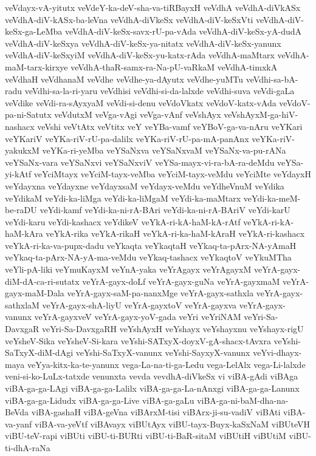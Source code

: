 {veVdayx-vA-yitutx
veVdeY-ka-deV-sha-va-tiRBayxH
veVdhA
veVdhA-diVkASx
veVdhA-diV-kASx-ba-leVna
veVdhA-diVkeSx
veVdhA-diV-keSxVti
veVdhA-diV-keSx-ga-LeMba
veVdhA-diV-keSx-savx-rU-pa-vAda
veVdhA-diV-keSx-yA-dudA
veVdhA-diV-keSxya
veVdhA-diV-keSx-ya-nitatx
veVdhA-diV-keSx-yanunx
veVdhA-diV-keSxyiM
veVdhA-diV-keSx-yu-katx-rAda
veVdhA-maMtarx
veVdhA-maM-tarx-kirxye
veVdhA-thaR-samx-ra-Na-pU-vaRkaM
veVdhA-timxkA
veVdhaH
veVdhanaM
veVdhe
veVdhe-ya-dAyutx
veVdhe-yuMTu
veVdhi-sa-bA-radu
veVdhi-sa-la-ri-yaru
veVdhisi
veVdhi-si-da-lalxde
veVdhi-suva
veVdi-gaLa
veVdike
veVdi-ra-sAyxyaM
veVdi-si-denu
veVdoVkatx
veVdoV-katx-vAda
veVdoV-pa-ni-Satutx
veVdutxM
veVga-vAgi
veVga-vAnf
veVshAyx
veVshAyxM-ga-hiV-nashacx
veVshi
veVtAtx
veVtitx
veY
veYBa-vamf
veYBoV-ga-va-nAru
veYKari
veYKariV
veYKa-riV-rU-pa-dalilx
veYKa-riV-rU-pa-mA-panAnx
veYKa-riV-yakukxM
veYKa-ri-yeMba
veYSaNxva
veYSaNxvaM
veYSaNx-va-pu-rANa
veYSaNx-vara
veYSaNxvi
veYSaNxviV
veYSa-mayx-vi-ra-bA-ra-deMdu
veYSa-yi-kAtf
veYciMtayx
veYciM-tayx-veMba
veYciM-tayx-veMdu
veYciMte
veYdayxH
veYdayxna
veYdayxne
veYdayxsaM
veYdayx-veMdu
veYdheVnuM
veYdika
veYdikaM
veYdi-ka-liMga
veYdi-ka-liMgaM
veYdi-ka-maMtarx
veYdi-ka-meM-be-raDU
veYdi-kamf
veYdi-ka-ni-rA-BAri
veYdi-ka-ni-rA-BAriV
veYdi-karU
veYdi-karu
veYdi-kashacx
veYdikeV
veYkA-ri-kA-haM-kA-rAtf
veYkA-ri-kA-haM-kAra
veYkA-rika
veYkA-rikaH
veYkA-ri-ka-haM-kAraH
veYkA-ri-kashacx
veYkA-ri-ka-va-pupx-dadu
veYkaqta
veYkaqtaH
veYkaq-ta-pArx-NA-yAmaH
veYkaq-ta-pArx-NA-yA-ma-veMdu
veYkaq-tashacx
veYkaqtoV
veYkuMTha
veYli-pA-liki
veYmuKayxM
veYnA-yaka
veYrAgayx
veYrAgayxM
veYrA-gayx-diM-dA-ca-ri-sutatx
veYrA-gayx-doLf
veYrA-gayx-guNa
veYrA-gayxmaM
veYrA-gayx-maM-Dala
veYrA-gayx-saM-pa-nanxMge
veYrA-gayx-sathxla
veYrA-gayx-sathxlaM
veYrA-gayx-shA-liyU
veYrA-gayxtoV
veYrA-gayxva
veYrA-gayx-vanunx
veYrA-gayxveV
veYrA-gayx-yoV-gada
veYri
veYriNAM
veYri-Sa-DavxgaR
veYri-Sa-DavxgaRH
veYshAyxH
veYshayx
veYshayxnu
veYshayx-rigU
veYsheV-Sika
veYsheV-Si-kara
veYshi-SATxyX-doyxV-gA-shacx-tAvxra
veYshi-SaTxyX-diM-dAgi
veYshi-SaTxyX-vanunx
veYshi-SayxyX-vanunx
veYvi-dhayx-maya
veYya-kitx-ka-te-yanunx
vega-La-na-ti-ga-Ledu
vega-LelAlx
vega-Li-lalxde
veni-si-ko-LuLx-tatxde
venunxta
vevda
vevdhA-diVkeSx
vi
viBA-gAdi
viBAga
viBA-ga-ga-LAgi
viBA-ga-ga-Lalilx
viBA-ga-ga-La-nAnxgi
viBA-ga-ga-Lanunx
viBA-ga-ga-Lidudx
viBA-ga-ga-Live
viBA-ga-gaLu
viBA-ga-ni-baM-dha-na-BeVda
viBA-gashaH
viBA-geVna
viBArxM-tisi
viBArx-ji-su-vadiV
viBAti
viBA-va-yanf
viBA-va-yeVtf
viBAvayx
viBUtAyx
viBU-tayx-Buyx-kaSxNaM
viBUteVH
viBU-teV-rapi
viBUti
viBU-ti-BURti
viBU-ti-BaR-sitaM
viBUtiH
viBUtiM
viBU-ti-dhA-raNa
}
